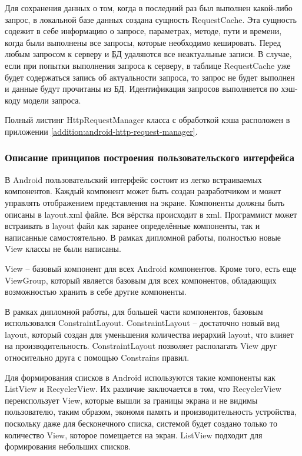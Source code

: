 Для сохранения данных о том, когда в последний раз был выполнен какой-либо запрос, в локальной базе данных создана сущность RequestCache.
Эта сущность содежит в себе информацию о запросе, параметрах, методе, пути и времени, когда были выполнены все запросы, которые необходимо кешировать.
Перед любым запросом к серверу и \hyperlink{gloss:db}{БД} удаляются все неактуальные записи.
В случае, если при попытки выполнения запроса к серверу, в таблице RequestCache уже будет содержаться запись об актуальности запроса, то запрос не будет выполнен и данные будут прочитаны из БД.
Идентификация запросов выполняется по хэш-коду модели запроса.

Полный листинг HttpRequestManager класса с обработкой кэша расположен в приложении \ref{addition:android-http-request-manager}.

\subsubsection{Описание принципов построения пользовательского интерфейса}\indent

В Android пользовательский интерфейс состоит из легко встраиваемых компонентов.
Каждый компонент может быть создан разработчиком и может управлять отображением представления на экране.
Компоненты должны быть описаны в layout.xml файле.
Вся вёрстка происходит в xml.
Программист может встраивать в layout файл как заранее определённые компоненты, так и написанные самостоятельно.
В рамках дипломной работы, полностью новые View классы не были написаны.

View – базовый компонент для всех Android компонентов.
Кроме того, есть еще ViewGroup, который является базовым для всех компонентов, обладающих возможностью хранить в себе другие компоненты.

В рамках дипломной работы, для большей части компонентов, базовым использовался ConstraintLayout.
ConstraintLayout – достаточно новый вид layout, который создан для уменьшения количества иерархий layout, что влияет на производительность.
ConstraintLayout позволяет располагать View друг относительно друга с помощью Constrains правил.

Для формирования списков в Android используются такие компоненты как ListView и RecyclerView.
Их различие заключается в том, что RecyclerView переиспользует View, которые вышли за границы экрана и не видимы пользователю, таким образом, экономя память и производительность устройства, поскольку даже для бесконечного списка, системой будет создано только то количество View, которое помещается на экран.
ListView подходит для формирования небольших списков.

